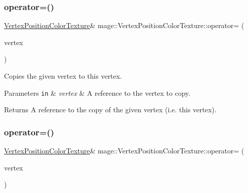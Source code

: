 \subsubsection{\texorpdfstring{operator=()}{operator=()}\hspace{0.1cm}{\footnotesize\ttfamily [1/2]}}
{\footnotesize\ttfamily \hyperlink{structmage_1_1_vertex_position_color_texture}{Vertex\+Position\+Color\+Texture}\& mage\+::\+Vertex\+Position\+Color\+Texture\+::operator= (\begin{DoxyParamCaption}\item[{const \hyperlink{structmage_1_1_vertex_position_color_texture}{Vertex\+Position\+Color\+Texture} \&}]{vertex }\end{DoxyParamCaption})\hspace{0.3cm}{\ttfamily [default]}}

Copies the given vertex to this vertex.


\begin{DoxyParams}[1]{Parameters}
\mbox{\tt in}  & {\em vertex} & A reference to the vertex to copy. \\
\hline
\end{DoxyParams}
\begin{DoxyReturn}{Returns}
A reference to the copy of the given vertex (i.\+e. this vertex). 
\end{DoxyReturn}
\hypertarget{structmage_1_1_vertex_position_color_texture_a7f3b2f23f7ed7f4d228f352fb1e53bcd}{}\label{structmage_1_1_vertex_position_color_texture_a7f3b2f23f7ed7f4d228f352fb1e53bcd} 
\subsubsection{\texorpdfstring{operator=()}{operator=()}\hspace{0.1cm}{\footnotesize\ttfamily [2/2]}}
{\footnotesize\ttfamily \hyperlink{structmage_1_1_vertex_position_color_texture}{Vertex\+Position\+Color\+Texture}\& mage\+::\+Vertex\+Position\+Color\+Texture\+::operator= (\begin{DoxyParamCaption}\item[{\hyperlink{structmage_1_1_vertex_position_color_texture}{Vertex\+Position\+Color\+Texture} \&\&}]{vertex }\end{DoxyParamCaption})\hspace{0.3cm}{\ttfamily [default]}}

